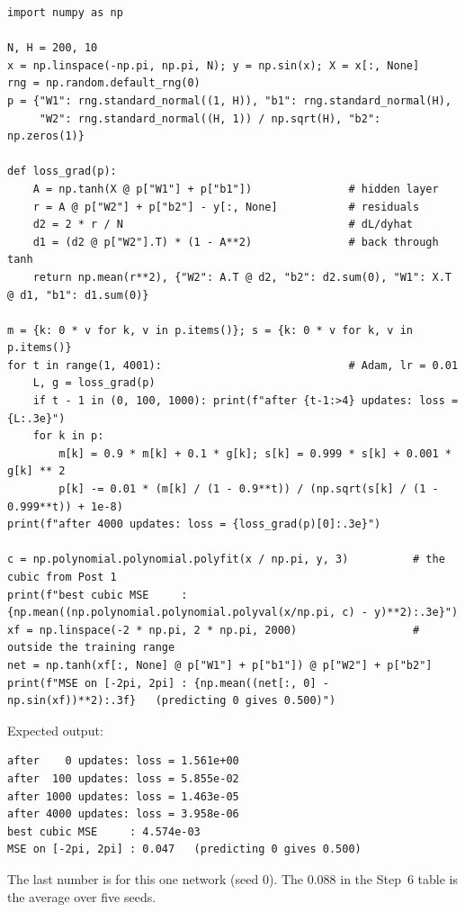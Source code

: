 \documentclass[11pt]{article}
\begin{document}
\begin{lstlisting}
import numpy as np

N, H = 200, 10
x = np.linspace(-np.pi, np.pi, N); y = np.sin(x); X = x[:, None]
rng = np.random.default_rng(0)
p = {"W1": rng.standard_normal((1, H)), "b1": rng.standard_normal(H),
     "W2": rng.standard_normal((H, 1)) / np.sqrt(H), "b2": np.zeros(1)}

def loss_grad(p):
    A = np.tanh(X @ p["W1"] + p["b1"])               # hidden layer
    r = A @ p["W2"] + p["b2"] - y[:, None]           # residuals
    d2 = 2 * r / N                                   # dL/dyhat
    d1 = (d2 @ p["W2"].T) * (1 - A**2)               # back through tanh
    return np.mean(r**2), {"W2": A.T @ d2, "b2": d2.sum(0), "W1": X.T @ d1, "b1": d1.sum(0)}

m = {k: 0 * v for k, v in p.items()}; s = {k: 0 * v for k, v in p.items()}
for t in range(1, 4001):                             # Adam, lr = 0.01
    L, g = loss_grad(p)
    if t - 1 in (0, 100, 1000): print(f"after {t-1:>4} updates: loss = {L:.3e}")
    for k in p:
        m[k] = 0.9 * m[k] + 0.1 * g[k]; s[k] = 0.999 * s[k] + 0.001 * g[k] ** 2
        p[k] -= 0.01 * (m[k] / (1 - 0.9**t)) / (np.sqrt(s[k] / (1 - 0.999**t)) + 1e-8)
print(f"after 4000 updates: loss = {loss_grad(p)[0]:.3e}")

c = np.polynomial.polynomial.polyfit(x / np.pi, y, 3)          # the cubic from Post 1
print(f"best cubic MSE     : {np.mean((np.polynomial.polynomial.polyval(x/np.pi, c) - y)**2):.3e}")
xf = np.linspace(-2 * np.pi, 2 * np.pi, 2000)                  # outside the training range
net = np.tanh(xf[:, None] @ p["W1"] + p["b1"]) @ p["W2"] + p["b2"]
print(f"MSE on [-2pi, 2pi] : {np.mean((net[:, 0] - np.sin(xf))**2):.3f}   (predicting 0 gives 0.500)")
\end{lstlisting}

Expected output:
\begin{lstlisting}[language={},basicstyle=\ttfamily\small]
after    0 updates: loss = 1.561e+00
after  100 updates: loss = 5.855e-02
after 1000 updates: loss = 1.463e-05
after 4000 updates: loss = 3.958e-06
best cubic MSE     : 4.574e-03
MSE on [-2pi, 2pi] : 0.047   (predicting 0 gives 0.500)
\end{lstlisting}

The last number is for this one network (seed 0). The $0.088$ in the Step~6 table is the average over five seeds.
\end{document}
